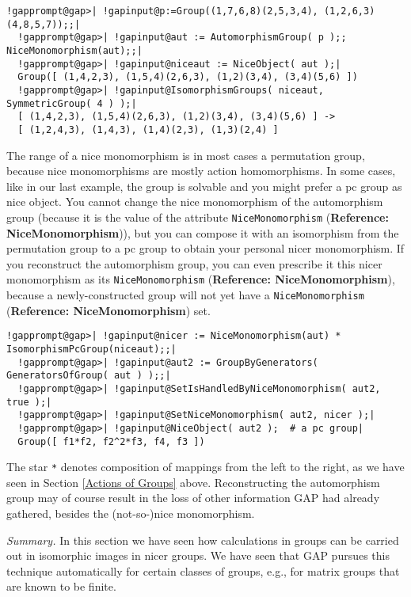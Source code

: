 \documentclass[a4paper,11pt]{report}
\begin{document}
{{ 
\begin{Verbatim}[commandchars=!@|,fontsize=\small,frame=single,label=Example]
  !gapprompt@gap>| !gapinput@p:=Group((1,7,6,8)(2,5,3,4), (1,2,6,3)(4,8,5,7));;|
  !gapprompt@gap>| !gapinput@aut := AutomorphismGroup( p );; NiceMonomorphism(aut);;|
  !gapprompt@gap>| !gapinput@niceaut := NiceObject( aut );|
  Group([ (1,4,2,3), (1,5,4)(2,6,3), (1,2)(3,4), (3,4)(5,6) ])
  !gapprompt@gap>| !gapinput@IsomorphismGroups( niceaut, SymmetricGroup( 4 ) );|
  [ (1,4,2,3), (1,5,4)(2,6,3), (1,2)(3,4), (3,4)(5,6) ] -> 
  [ (1,2,4,3), (1,4,3), (1,4)(2,3), (1,3)(2,4) ]
\end{Verbatim}
 

 The range of a nice monomorphism is in most cases a permutation group, because
nice monomorphisms are mostly action homomorphisms. In some cases, like in our
last example, the group is solvable and you might prefer a pc group as nice
object. You cannot change the nice monomorphism of the automorphism group
(because it is the value of the attribute \texttt{NiceMonomorphism} (\textbf{Reference: NiceMonomorphism})), but you can compose it with an isomorphism from the permutation group to a
pc group to obtain your personal nicer monomorphism. If you reconstruct the
automorphism group, you can even prescribe it this nicer monomorphism as its \texttt{NiceMonomorphism} (\textbf{Reference: NiceMonomorphism}), because a newly-constructed group will not yet have a \texttt{NiceMonomorphism} (\textbf{Reference: NiceMonomorphism}) set. 

 
\begin{Verbatim}[commandchars=!@|,fontsize=\small,frame=single,label=Example]
  !gapprompt@gap>| !gapinput@nicer := NiceMonomorphism(aut) * IsomorphismPcGroup(niceaut);;|
  !gapprompt@gap>| !gapinput@aut2 := GroupByGenerators( GeneratorsOfGroup( aut ) );;|
  !gapprompt@gap>| !gapinput@SetIsHandledByNiceMonomorphism( aut2, true );|
  !gapprompt@gap>| !gapinput@SetNiceMonomorphism( aut2, nicer );|
  !gapprompt@gap>| !gapinput@NiceObject( aut2 );  # a pc group|
  Group([ f1*f2, f2^2*f3, f4, f3 ])
\end{Verbatim}
 

 The star \texttt{*} denotes composition of mappings from the left to the right, as we have seen in
Section \ref{Actions of Groups} above. Reconstructing the automorphism group may of course result in the loss
of other information \textsf{GAP} had already gathered, besides the (not-so-)nice monomorphism. 

 \emph{Summary.} In this section we have seen how calculations in groups can be carried out in
isomorphic images in nicer groups. We have seen that \textsf{GAP} pursues this technique automatically for certain classes of groups, e.g., for
matrix groups that are known to be finite. }

}
\end{document}
